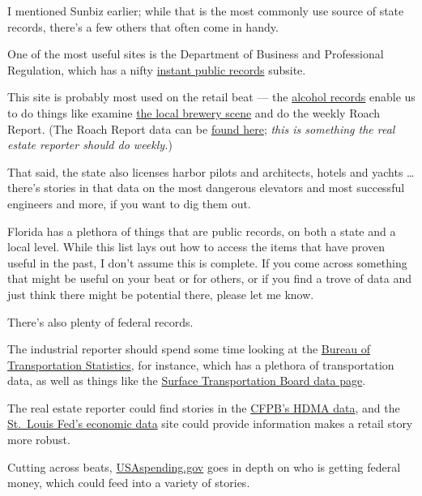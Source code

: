 \documentclass[
  11pt,
  american,
  letterpaperpaper,
  extrafontsizes,onecolumn,openright
  ]{memoir}
\newlength{\rf}
\begin{document}
I mentioned Sunbiz earlier; while that is the most commonly use source of state records, there's a few others that often come in handy.

One of the most useful sites is the Department of Business and Professional Regulation, which has a nifty \href{http://www.myfloridalicense.com/dbpr/instant-public-records/}{instant public records} subsite.

This site is probably most used on the retail beat --- the \href{http://www.myfloridalicense.com/DBPR/alcoholic-beverages-and-tobacco/public-records/}{alcohol records} enable us to do things like examine \href{https://reportertim.github.io/breweries_data.html}{the local brewery scene} and do the weekly Roach Report. (The Roach Report data can be \href{http://www.myfloridalicense.com/DBPR/hotels-restaurants/public-records/\#1506344763000-101d4ee5-7a59}{found here}; \emph{this is something the real estate reporter should do weekly.})

That said, the state also licenses harbor pilots and architects, hotels and yachts \ldots{} there's stories in that data on the most dangerous elevators and most successful engineers and more, if you want to dig them out.

Florida has a plethora of things that are public records, on both a state and a local level. While this list lays out how to access the items that have proven useful in the past, I don't assume this is complete. If you come across something that might be useful on your beat or for others, or if you find a trove of data and just think there might be potential there, please let me know.

There's also plenty of federal records.

The industrial reporter should spend some time looking at the \href{https://transtats.bts.gov/}{Bureau of Transportation Statistics}, for instance, which has a plethora of transportation data, as well as things like the \href{https://transtats.bts.gov/}{Surface Transportation Board data page}.

The real estate reporter could find stories in the \href{https://www.consumerfinance.gov/data-research/hmda/historic-data/}{CFPB's HDMA data}, and the \href{https://fred.stlouisfed.org/}{St.~Louis Fed's economic data} site could provide information makes a retail story more robust.

Cutting across beats, \href{https://www.usaspending.gov/}{USAspending.gov} goes in depth on who is getting federal money, which could feed into a variety of stories.
\end{document}
